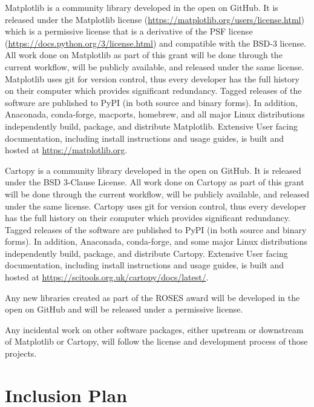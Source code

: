 \documentclass[12pt]{article}
\numberwithin{page}{section}
\begin{document}
Matplotlib is a community library developed in the open on GitHub.
It is released under the Matplotlib license
(\url{https://matplotlib.org/users/license.html}) which is a permissive
license that is a derivative of the PSF license
(\url{https://docs.python.org/3/license.html}) and compatible with the
BSD-3 license.  All work done on Matplotlib as part of this grant will
be done through the current workflow, will be publicly available, and
released under the same license.  Matplotlib uses git for version
control, thus every developer has the full history on their computer
which provides significant redundancy.  Tagged releases of the
software are published to PyPI (in both source and binary forms).  In
addition, Anaconada, conda-forge, macports, homebrew, and all major Linux
distributions independently build, package, and distribute Matplotlib.
Extensive User facing documentation, including install instructions
and usage guides, is built and hosted at \url{https://matplotlib.org}.

Cartopy is a community library developed in the open on GitHub.  It is released
under the BSD 3-Clause License.  All work done on Cartopy as part of this grant
will be done through the current workflow, will be publicly available, and
released under the same license.  Cartopy uses git for version control, thus
every developer has the full history on their computer which provides
significant redundancy.  Tagged releases of the software are published to PyPI
(in both source and binary forms).
In addition, Anaconada, conda-forge, and some major Linux
distributions independently build, package, and distribute Cartopy.
Extensive User facing documentation, including install instructions and usage
guides, is built and hosted at
\url{https://scitools.org.uk/cartopy/docs/latest/}.

Any new libraries created as part of the ROSES award will be developed
in the open on GitHub and will be released under a permissive license.

Any incidental work on other software packages, either upstream or
downstream of Matplotlib or Cartopy, will follow the license and development
process of those projects.

\newpage

\section{Inclusion Plan}
\setcounter{page}{1}
\end{document}
